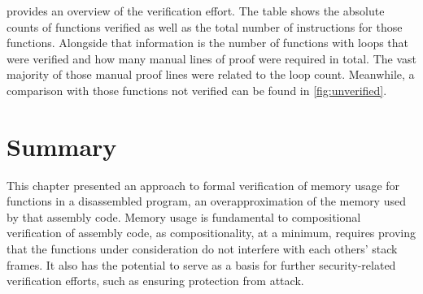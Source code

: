  provides an overview of the verification effort.
The table shows the absolute counts of functions verified
as well as the total number of instructions for those functions.
Alongside that information is the number of functions with loops
that were verified and how many manual lines of proof were required in total.
The vast majority of those manual proof lines were related to the loop count.
Meanwhile, a comparison with those functions not verified
can be found in \cref{fig:unverified}.

\section{Summary}
This chapter presented an approach to formal verification of memory usage
for functions in a disassembled program,
an overapproximation of the memory used by that assembly code.
Memory usage is fundamental to compositional verification of assembly code,
as compositionality, at a minimum, requires proving
that the functions under consideration
do not interfere with each others' stack frames.
It also has the potential to serve as a basis for further security-related
verification efforts, such as ensuring protection from  attack.
